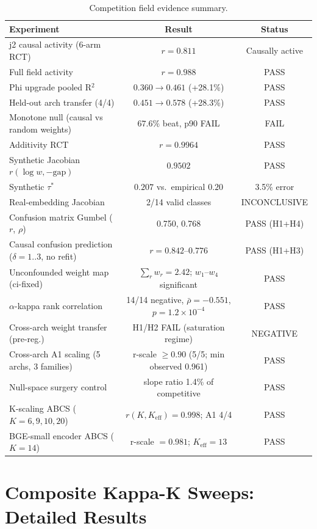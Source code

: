 \documentclass{article}
\begin{document}
\begin{table}[h!]
\centering
\caption{Competition field evidence summary.}
\label{tab:competition}
\small
\begin{tabular}{lcc}
\toprule
Experiment & Result & Status \\
\midrule
j2 causal activity (6-arm RCT) & $r=0.811$ & Causally active \\
Full field activity & $r=0.988$ & PASS \\
Phi upgrade pooled R$^2$ & $0.360\to0.461$ (+28.1\%) & PASS \\
Held-out arch transfer (4/4) & $0.451\to0.578$ (+28.3\%) & PASS \\
Monotone null (causal vs random weights) & $67.6\%$ beat, p90 FAIL & FAIL \\
Additivity RCT & $r=0.9964$ & PASS \\
Synthetic Jacobian $r(\log w,-\mathrm{gap})$ & $0.9502$ & PASS \\
Synthetic $\tau^*$ & $0.207$ vs.\ empirical $0.20$ & 3.5\% error \\
Real-embedding Jacobian & 2/14 valid classes & INCONCLUSIVE \\
Confusion matrix Gumbel ($r$, $\rho$) & 0.750, 0.768 & PASS (H1+H4) \\
Causal confusion prediction ($\delta=1..3$, no refit) & $r=0.842$--$0.776$ & PASS (H1+H3) \\
Unconfounded weight map (ci-fixed) & $\sum_r w_r=2.42$; $w_1$--$w_4$ significant & PASS \\
$\alpha$-kappa rank correlation & 14/14 negative, $\bar\rho=-0.551$, $p=1.2\times10^{-4}$ & PASS \\
Cross-arch weight transfer (pre-reg.) & H1/H2 FAIL (saturation regime) & NEGATIVE \\
Cross-arch A1 scaling (5 archs, 3 families) & r-scale $\geq 0.90$ (5/5; min observed 0.961) & PASS \\
Null-space surgery control & slope ratio 1.4\% of competitive & PASS \\
K-scaling ABCS ($K=6,9,10,20$) & $r(K,K_\mathrm{eff})=0.998$; A1 4/4 & PASS \\
BGE-small encoder ABCS ($K=14$) & r-scale $=0.981$; $K_\mathrm{eff}=13$ & PASS \\
\bottomrule
\end{tabular}
\end{table}

\section{Composite Kappa-K Sweeps: Detailed Results}
\label{app:kappa-k-sweeps}
\end{document}
